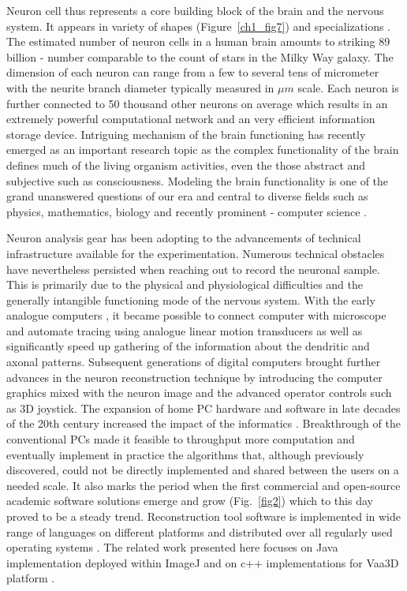 Neuron cell thus represents a core building block of the brain and the nervous system. It appears in variety of shapes (Figure~\ref{ch1_fig7}) and specializations \cite{ascolitrees}. The estimated number of neuron cells in a human brain amounts to striking 89 billion \cite{herculano2009human} - number comparable to the count of stars in the Milky Way galaxy. The dimension of each neuron can range from a few to several tens of micrometer with the neurite branch diameter typically measured in $\mu m$ scale. Each neuron is further connected to 50 thousand other neurons on average which results in an extremely powerful computational network and an very efficient information storage device. Intriguing mechanism of the brain functioning has recently emerged as an important research topic as the complex functionality of the brain defines much of the living organism activities, even the those abstract and subjective such as consciousness. Modeling the brain functionality is one of the grand unanswered questions of our era and central to diverse fields such as physics, mathematics, biology and recently prominent - computer science \cite{markram2015reconstruction}.

Neuron analysis gear has been adopting to the advancements of technical infrastructure available for the experimentation. Numerous technical obstacles have nevertheless persisted when reaching out to record the neuronal sample. This is primarily due to the physical and physiological difficulties and the generally intangible functioning mode of the nervous system. With the early analogue computers \cite{glaser1965semi}, it became possible to connect computer with microscope and automate tracing using analogue linear motion transducers as well as significantly speed up gathering of the information about the dendritic and axonal patterns. Subsequent generations of digital computers \cite{capowski1981accurate, capowski1977computer} brought further advances in the neuron reconstruction technique by introducing the computer graphics mixed with the neuron image and the advanced operator controls such as 3D joystick. The expansion of home PC hardware and software in late decades of the 20th century increased the impact of the informatics \cite{halavi2012digital}. Breakthrough of the conventional PCs made it feasible to throughput more computation and eventually implement in practice the algorithms that, although previously discovered, could not be directly implemented and shared between the users on a needed scale. It also marks the period when the first commercial and open-source academic software solutions emerge and grow (Fig.~\ref{fig2}) which to this day proved to be a steady trend. Reconstruction tool software is implemented in wide range of languages on different platforms and distributed over all regularly used operating systems \cite{meijering2010neuron, acciai2016automated}. The related work presented here focuses on Java implementation deployed within ImageJ \cite{abramoff2004image, longair2011simple, pool2008neuritetracer} and on c++ implementations for Vaa3D platform \cite{peng2014extensible}.

